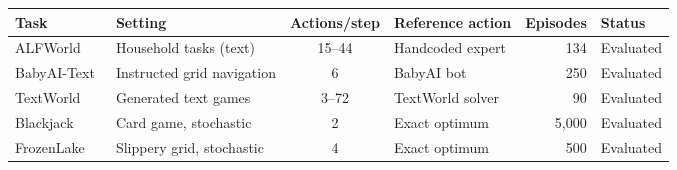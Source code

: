 \begin{tabular}{l l c l r l}
    \toprule
    Task & Setting & Actions/step & Reference action & Episodes & Status \\
    \midrule
    ALFWorld~\cite{shridhar2021alfworld} & Household tasks (text) & 15--44 & Handcoded expert & 134 & Evaluated \\
    \rowcolor{gray!10}BabyAI-Text~\cite{chevalierboisvert2019babyai,carta2023grounding} & Instructed grid navigation & 6 & BabyAI bot & 250 & Evaluated \\
    TextWorld~\cite{cote2018textworld} & Generated text games & 3--72 & TextWorld solver & 90 & Evaluated \\
    \rowcolor{gray!10}Blackjack~\cite{zha2019rlcard} & Card game, stochastic & 2 & Exact optimum & 5{,}000 & Evaluated \\
    FrozenLake~\cite{towers2024gymnasium} & Slippery grid, stochastic & 4 & Exact optimum & 500 & Evaluated \\
    \bottomrule
\end{tabular}